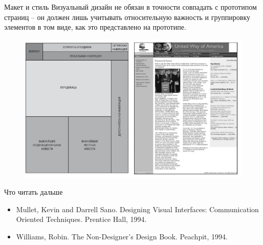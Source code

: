 \documentclass{beamer}
\begin{document}
\begin{frame}[t]{Макет и стиль}
	Визуальный дизайн не обязан в точности совпадать с прототипом страниц – он должен лишь учитывать относительную важность и группировку элементов в том виде, как это представлено на прототипе.
	\begin{figure}[h]
		\centering
		\includegraphics[scale=0.5]{images/lec05-pic04.png}
	\end{figure}
\end{frame} 

\begin{frame}[t]{Что читать дальше}
	\begin{itemize}
		\item Mullet, Kevin and Darrell Sano. Designing Visual Interfaces: Communication Oriented Techniques. Prentice Hall, 1994.
		\item Williams, Robin. The Non-Designer's Design Book. Peachpit, 1994.
	\end{itemize}
\end{frame}
\end{document}
